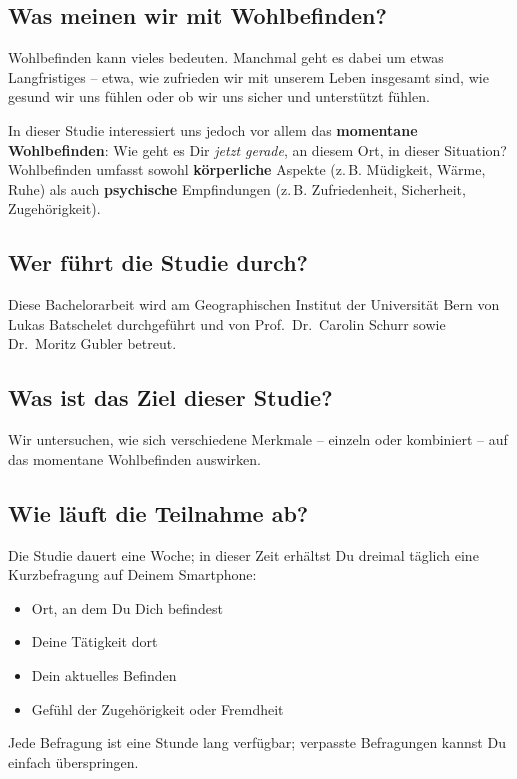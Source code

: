 \begin{appendices}
\subsection*{Was meinen wir mit Wohlbefinden?}
Wohlbefinden kann vieles bedeuten. Manchmal geht es dabei um etwas Langfristiges – etwa, wie zufrieden wir mit unserem Leben insgesamt sind, wie gesund wir uns fühlen oder ob wir uns sicher und unterstützt fühlen.

In dieser Studie interessiert uns jedoch vor allem das \textbf{momentane Wohlbefinden}: Wie geht es Dir \emph{jetzt gerade}, an diesem Ort, in dieser Situation?  
Wohlbefinden umfasst sowohl \textbf{körperliche} Aspekte (z.\,B. Müdigkeit, Wärme, Ruhe) als auch \textbf{psychische} Empfindungen (z.\,B. Zufriedenheit, Sicherheit, Zugehörigkeit).

\subsection*{Wer führt die Studie durch?}
Diese Bachelorarbeit wird am Geographischen Institut der Universität Bern von Lukas Batschelet durchgeführt und von Prof.\ Dr.\ Carolin Schurr sowie Dr.\ Moritz Gubler betreut.

\subsection*{Was ist das Ziel dieser Studie?}
Wir untersuchen, wie sich verschiedene Merkmale – einzeln oder kombiniert – auf das momentane Wohlbefinden auswirken.

\subsection*{Wie läuft die Teilnahme ab?}
Die Studie dauert eine Woche; in dieser Zeit erhältst Du dreimal täglich eine Kurzbefragung auf Deinem Smartphone:

\begin{itemize}\setlength{\itemsep}{0pt}
  \item Ort, an dem Du Dich befindest
  \item Deine Tätigkeit dort
  \item Dein aktuelles Befinden
  \item Gefühl der Zugehörigkeit oder Fremdheit
\end{itemize}

Jede Befragung ist eine Stunde lang verfügbar; verpasste Befragungen kannst Du einfach überspringen.


\end{appendices}
